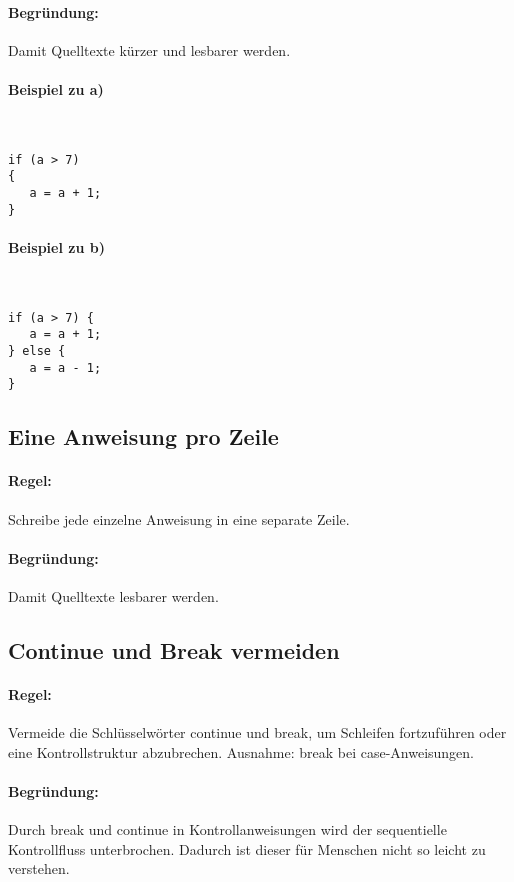 \paragraph{Begründung:} Damit Quelltexte kürzer und lesbarer werden.

\paragraph{Beispiel zu a)} \hspace{0pt}\\
\begin{lstlisting}
if (a > 7)
{
   a = a + 1;
}
\end{lstlisting}

\paragraph{Beispiel zu b)} \hspace{0pt}\\
\begin{lstlisting}
if (a > 7) {
   a = a + 1;
} else {
   a = a - 1;
}
\end{lstlisting}

\subsection{Eine Anweisung pro Zeile}

\paragraph{Regel:} Schreibe jede einzelne Anweisung in eine separate Zeile.
\paragraph{Begründung:} Damit Quelltexte lesbarer werden.

\subsection{Continue und Break vermeiden}

\paragraph{Regel:} Vermeide die Schlüsselwörter continue und break, um Schleifen fortzuführen oder eine Kontrollstruktur abzubrechen. Ausnahme: break bei case-Anweisungen.
\paragraph{Begründung:} Durch break und continue in Kontrollanweisungen wird der sequentielle Kontrollfluss unterbrochen. Dadurch ist dieser für Menschen nicht so leicht zu verstehen.

